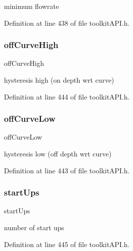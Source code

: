 minimum flowrate 

Definition at line 438 of file toolkit\+A\+P\+I.\+h.

\mbox{\label{struct_s_m___pump_stats_a54bac8a593e64e581a2347b8ee12f51e}} 
\subsubsection{\texorpdfstring{offCurveHigh}{offCurveHigh}}
{\footnotesize\ttfamily off\+Curve\+High}

hysteresis high (on depth wrt curve) 

Definition at line 444 of file toolkit\+A\+P\+I.\+h.

\mbox{\label{struct_s_m___pump_stats_affcf9c914facbda0b5007041aded7f09}} 
\subsubsection{\texorpdfstring{offCurveLow}{offCurveLow}}
{\footnotesize\ttfamily off\+Curve\+Low}

hysteresis low (off depth wrt curve) 

Definition at line 443 of file toolkit\+A\+P\+I.\+h.

\mbox{\label{struct_s_m___pump_stats_a7499d03edd943b9f751b6ca6527abca5}} 
\subsubsection{\texorpdfstring{startUps}{startUps}}
{\footnotesize\ttfamily start\+Ups}

number of start ups 

Definition at line 445 of file toolkit\+A\+P\+I.\+h.

\mbox{\label{struct_s_m___pump_stats_a60fffeca33e0487e4b7cac3898b2cf05}} 
